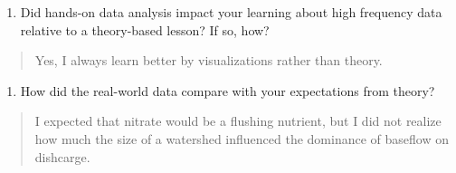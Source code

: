 \documentclass[]{article}
\providecommand{\tightlist}{%
  \setlength{\itemsep}{0pt}\setlength{\parskip}{0pt}}
\begin{document}
\begin{enumerate}
\def\labelenumi{\arabic{enumi}.}
\setcounter{enumi}{18}
\tightlist
\item
  Did hands-on data analysis impact your learning about high frequency
  data relative to a theory-based lesson? If so, how?
\end{enumerate}

\begin{quote}
Yes, I always learn better by visualizations rather than theory.
\end{quote}

\begin{enumerate}
\def\labelenumi{\arabic{enumi}.}
\setcounter{enumi}{19}
\tightlist
\item
  How did the real-world data compare with your expectations from
  theory?
\end{enumerate}

\begin{quote}
I expected that nitrate would be a flushing nutrient, but I did not
realize how much the size of a watershed influenced the dominance of
baseflow on dishcarge.
\end{quote}
\end{document}
